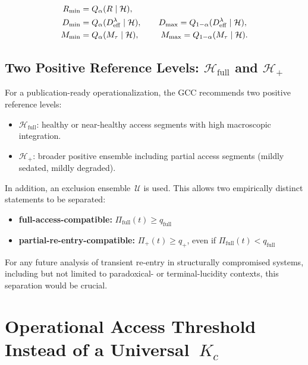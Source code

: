 ﻿\documentclass[11pt,a4paper]{article}
\theoremstyle{plain}
\theoremstyle{definition}
\theoremstyle{remark}
\newcommand{\Deff}{D_{\mathrm{eff}}}
\newcommand{\Mtau}{M_{\tau}}
\newcommand{\Rmin}{R_{\min}}
\newcommand{\Dmin}{D_{\min}}
\newcommand{\Dmax}{D_{\max}}
\newcommand{\Mmin}{M_{\min}}
\newcommand{\Mmax}{M_{\max}}
\begin{document}
\begin{align}
\Rmin &= Q_{\alpha}(R \mid \mathcal{H}), \notag\\
\Dmin &= Q_{\alpha}(\Deff^{\lambda} \mid \mathcal{H}), \qquad
\Dmax = Q_{1-\alpha}(\Deff^{\lambda} \mid \mathcal{H}), \label{eq:kalib}\\
\Mmin &= Q_{\alpha}(\Mtau \mid \mathcal{H}), \qquad\;\;
\Mmax = Q_{1-\alpha}(\Mtau \mid \mathcal{H}). \notag
\end{align}

\subsection{Two Positive Reference Levels: $\mathcal{H}_{\mathrm{full}}$ and $\mathcal{H}_{+}$}

For a publication-ready operationalization, the GCC recommends two positive reference levels:

\begin{itemize}
\item $\mathcal{H}_{\mathrm{full}}$: healthy or near-healthy access segments with high macroscopic integration.
\item $\mathcal{H}_{+}$: broader positive ensemble including partial access segments (mildly sedated, mildly degraded).
\end{itemize}

In addition, an exclusion ensemble~$\mathcal{U}$ is used. This allows two empirically distinct statements to be separated:

\begin{itemize}
\item \textbf{full-access-compatible:} $\Pi_{\mathrm{full}}(t) \geq q_{\mathrm{full}}$
\item \textbf{partial-re-entry-compatible:} $\Pi_{+}(t) \geq q_{+}$, even if $\Pi_{\mathrm{full}}(t) < q_{\mathrm{full}}$
\end{itemize}

For any future analysis of transient re-entry in structurally compromised systems, including but not limited to paradoxical- or terminal-lucidity contexts, this separation would be crucial.


\section{Operational Access Threshold Instead of a Universal~$K_c$}
\label{sec:schwelle}
\end{document}

